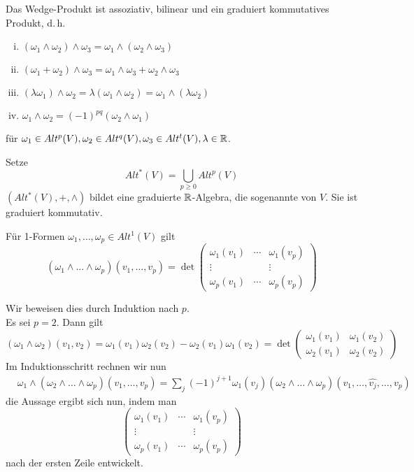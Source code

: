 \Lem{}
Das Wedge-Produkt ist assoziativ, bilinear und ein graduiert kommutatives Produkt, d.\,h.
\begin{enumerate}[i.]
		\item $(\omega_1 \wedge \omega_2) \wedge \omega_3 = \omega_1 \wedge (\omega_2 \wedge \omega_3)$
	\item $(\omega_1 + \omega_2) \wedge \omega_3 = \omega_1 \wedge \omega_3 + \omega_2 \wedge \omega_3$
	\item $(\lambda \omega_1)\wedge \omega_2 = \lambda (\omega_1 \wedge \omega_2) = \omega_1 \wedge (\lambda \omega_2)$
	\item $\omega_1 \wedge \omega_2 = (-1)^{pq} (\omega_2 \wedge \omega_1)$
\end{enumerate}
für $\omega_1 \in Alt^p(V), \omega_2 \in Alt^q(V), \omega_3 \in Alt^t(V), \lambda \in \mathbb{R}$.

\Def{}
Setze
\[ Alt^*(V) = \bigcup_{p\geq 0} Alt^p(V) \]
$(Alt^*(V), +,\wedge)$ bildet eine graduierte $\mathbb{R}$-Algebra, die sogenannte  von $V$. Sie ist graduiert kommutativ.

\Lem{}
Für 1-Formen $\omega_1, \ldots, \omega_p \in Alt^1(V)$ gilt
\[ (\omega_1 \wedge \ldots \wedge \omega_p)(v_1,\ldots, v_p) = \det 
\left(
\begin{matrix}
\omega_1(v_1) & \cdots & \omega_1(v_p)\\
\vdots & & \vdots\\
\omega_p(v_1) & \cdots & \omega_p(v_p)
\end{matrix}
\right)\]
\begin{Beweis}{}
Wir beweisen dies durch Induktion nach $p$.\\
Es sei $p = 2$. Dann gilt
\[ (\omega_1 \wedge \omega_2)(v_1, v_2) = \omega_1(v_1) \omega_2(v_2) - \omega_2 (v_1) \omega_1(v_2) = 
\det 
\left(
\begin{matrix}
\omega_1(v_1) & \omega_1(v_2)\\
\omega_2(v_1) &  \omega_2(v_2)
\end{matrix}
\right)
 \]
Im Induktionsschritt rechnen wir nun
\begin{align*}
&\omega_1 \wedge ( \omega_2 \wedge \ldots \wedge \omega_p) (v_1, \ldots, v_p)
= \sum_{j} (-1)^{j+1} \omega_1(v_j) (\omega_2 \wedge \ldots \wedge \omega_p) (v_1, \ldots, \widehat{v_j}, \ldots, v_p)
\end{align*}
die Aussage ergibt sich nun, indem man
\[\left(
\begin{matrix}
\omega_1(v_1) & \cdots & \omega_1(v_p)\\
\vdots & & \vdots\\
\omega_p(v_1) & \cdots & \omega_p(v_p)
\end{matrix}
\right)\]
nach der ersten Zeile entwickelt.
\end{Beweis}

